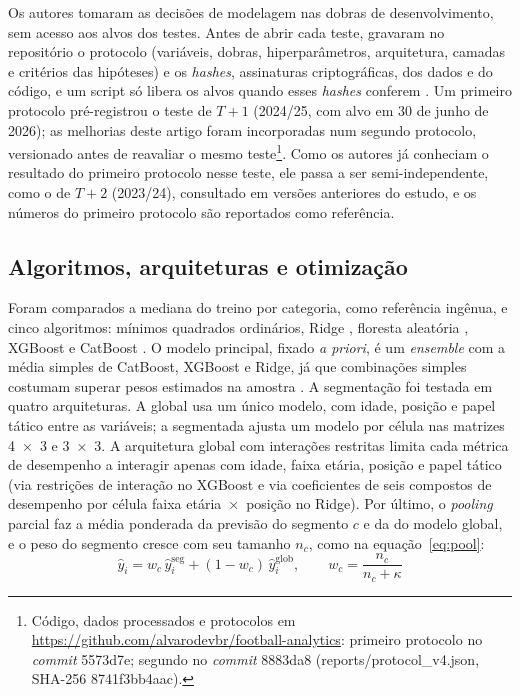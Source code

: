 \documentclass[article, 12pt, oneside, a4paper, english, brazil, section=TITLE]{abntex2}
\begin{document}
Os autores tomaram as decisões de modelagem nas dobras de desenvolvimento, sem acesso aos alvos dos testes.
Antes de abrir cada teste, gravaram no repositório o protocolo (variáveis, dobras, hiperparâmetros, arquitetura, camadas e critérios das hipóteses) e os \textit{hashes}, assinaturas criptográficas, dos dados e do código, e um script só libera os alvos quando esses \textit{hashes} conferem \cite{nosek2018}.
Um primeiro protocolo pré-registrou o teste de $T+1$ (2024/25, com alvo em 30 de junho de 2026); as melhorias deste artigo foram incorporadas num segundo protocolo, versionado antes de reavaliar o mesmo teste\footnote{Código, dados processados e protocolos em \url{https://github.com/alvarodevbr/football-analytics}: primeiro protocolo no \textit{commit} 5573d7e; segundo no \textit{commit} 8883da8 (reports/protocol\_v4.json, SHA-256 8741f3bb4aac).}.
Como os autores já conheciam o resultado do primeiro protocolo nesse teste, ele passa a ser semi-independente, como o de $T+2$ (2023/24), consultado em versões anteriores do estudo, e os números do primeiro protocolo são reportados como referência.

\subsection{Algoritmos, arquiteturas e otimização}

Foram comparados a mediana do treino por categoria, como referência ingênua, e cinco algoritmos: mínimos quadrados ordinários, Ridge \cite{hoerl1970}, floresta aleatória \cite{breiman2001}, XGBoost \cite{chen2016} e CatBoost \cite{prokhorenkova2018}.
O modelo principal, fixado \textit{a priori}, é um \textit{ensemble} com a média simples de CatBoost, XGBoost e Ridge, já que combinações simples costumam superar pesos estimados na amostra \cite{smith2009}.
A segmentação foi testada em quatro arquiteturas.
A global usa um único modelo, com idade, posição e papel tático entre as variáveis; a segmentada ajusta um modelo por célula nas matrizes 4~×~3 e 3~×~3.
A arquitetura global com interações restritas limita cada métrica de desempenho a interagir apenas com idade, faixa etária, posição e papel tático (via restrições de interação no XGBoost e via coeficientes de seis compostos de desempenho por célula faixa etária~×~posição no Ridge).
Por último, o \textit{pooling} parcial faz a média ponderada da previsão do segmento $c$ e da do modelo global, e o peso do segmento cresce com seu tamanho $n_c$, como na equação~\eqref{eq:pool}:
\begin{equation}
  \hat{y}_i = w_c\,\hat{y}^{\mathrm{seg}}_i + (1 - w_c)\,\hat{y}^{\mathrm{glob}}_i, \qquad w_c = \frac{n_c}{n_c + \kappa}
  \label{eq:pool}
\end{equation}
\end{document}
